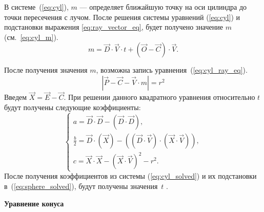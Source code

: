 В системе~(\ref{eq:cyl}), $m$ --- определяет ближайшую точку на оси цилиндра до точки пересечения с лучом. После решения системы уравнений (\ref{eq:cyl})  и подстановки выражения \ref{eq:ray_vector_eq}, будет получено значение $m$ (см.~\ref{eq:cyl_m}).
\begin{equation}
	m = \vec{D} \cdot \vec{V} \cdot t  + (\vec{O} - \vec{C}) \cdot \vec{V}.
	\label{eq:cyl_m}
\end{equation}

После получения значения $m$, возможна запись уравнения~(\ref{eq:cyl_ray_eq}).
\begin{equation}
 	|\vec{P}-\vec{C}-\vec{V} \cdot m| = r^{2}
	\label{eq:cyl_ray_eq}
\end{equation}
Введем $\vec{X} = \vec{E} - \vec{C}$.
При решении данного квадратного уравнения относительно $t$ будут получены следующие коэффициенты:
\begin{equation}
	\begin{cases}
		a = \vec{D} \cdot \vec{D} - (\vec{D} \cdot \vec{D}), \\
		\frac{b}{2} = \vec{D} \cdot (\vec{X}) - ((\vec{D} \cdot \vec{V}) \cdot (\vec{X} \cdot \vec{V})), \\
		c = \vec{X} \cdot \vec{X} - (\vec{X} \cdot \vec{V})^{2} - r^{2}.
	\end{cases}
	\label{eq:cyl_solved}
\end{equation}
После получения коэффициентов из системы (\ref{eq:cyl_solved}) и их подстановки в~(\ref{eq:sphere_solved}), будут получены значения~$t$ \cite{cyl_inter}.


\textbf{Уравнение конуса}


